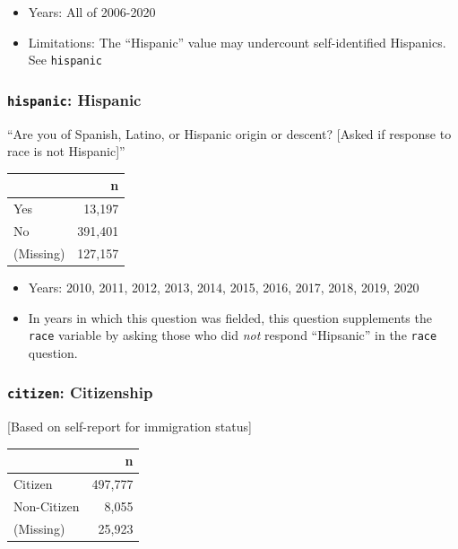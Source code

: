 \documentclass[10pt,article,oneside]{memoir}
\theoremstyle{definition}
\begin{document}
\begin{itemize}
\tightlist
\item
  Years: All of 2006-2020
\item
  Limitations: The ``Hispanic'' value may undercount self-identified
  Hispanics. See \texttt{hispanic}
\end{itemize}

\hypertarget{hispanic-hispanic}{%
\subsubsection{\texorpdfstring{\texttt{hispanic}:
Hispanic}{hispanic: Hispanic}}\label{hispanic-hispanic}}

``Are you of Spanish, Latino, or Hispanic origin or descent? {[}Asked if
response to race is not Hispanic{]}''

\begin{table}[H]
\centering
\begin{tabular}{lr}
\toprule
 & n\\
\midrule
Yes & 13,197\\
No & 391,401\\
(Missing) & 127,157\\
\bottomrule
\end{tabular}
\end{table}

\begin{itemize}
\tightlist
\item
  Years: 2010, 2011, 2012, 2013, 2014, 2015, 2016, 2017, 2018, 2019,
  2020
\item
  In years in which this question was fielded, this question supplements
  the \texttt{race} variable by asking those who did \emph{not} respond
  ``Hipsanic'' in the \texttt{race} question.
\end{itemize}

\hypertarget{citizen-citizenship}{%
\subsubsection{\texorpdfstring{\texttt{citizen}:
Citizenship}{citizen: Citizenship}}\label{citizen-citizenship}}

{[}Based on self-report for immigration status{]}

\begin{table}[H]
\centering
\begin{tabular}{lr}
\toprule
 & n\\
\midrule
Citizen & 497,777\\
Non-Citizen & 8,055\\
(Missing) & 25,923\\
\bottomrule
\end{tabular}
\end{table}
\end{document}
